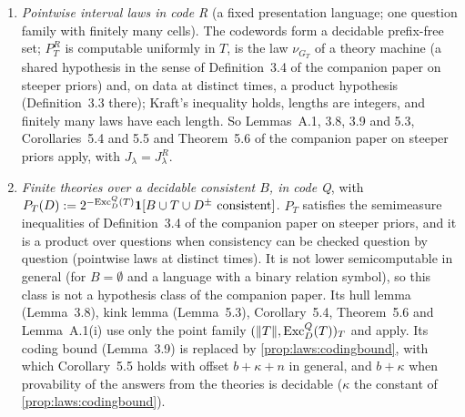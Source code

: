 \begin{proposition}\label{prop:laws:P2hyp}
\leavevmode
\begin{enumerate}[label=(\alph*),itemsep=1pt,topsep=2pt]
\item \emph{Pointwise interval laws in code R} (a fixed presentation language; one question family with finitely many cells). The codewords form a decidable prefix-free set; $P^R_T$ is computable uniformly in $T$, is the law $\nu_{G_T}$ of a theory machine (a shared hypothesis in the sense of Definition~3.4 of the companion paper on steeper priors) and, on data at distinct times, a product hypothesis (Definition~3.3 there); Kraft's inequality holds, lengths are integers, and finitely many laws have each length. So Lemmas~A.1, 3.8, 3.9 and 5.3, Corollaries~5.4 and 5.5 and Theorem~5.6 of the companion paper on steeper priors apply, with $J_\lambda=J^R_\lambda$.
\item \emph{Finite theories over a decidable consistent $B$, in code Q}, with $P_T(D):=2^{-\mathrm{Exc}^Q_D(T)}\mathbf{1}[B\cup T\cup D^\pm\text{ consistent}]$. $P_T$ satisfies the semimeasure inequalities of Definition~3.4 of the companion paper on steeper priors, and it is a product over questions when consistency can be checked question by question (pointwise laws at distinct times). It is not lower semicomputable in general (for $B=\emptyset$ and a language with a binary relation symbol), so this class is not a hypothesis class of the companion paper. Its hull lemma (Lemma~3.8), kink lemma (Lemma~5.3), Corollary~5.4, Theorem~5.6 and Lemma~A.1(i) use only the point family $(\lVert T\rVert,\mathrm{Exc}^Q_D(T))_T$ and apply. Its coding bound (Lemma~3.9) is replaced by \cref{prop:laws:codingbound}, with which Corollary~5.5 holds with offset $b+\kappa+n$ in general, and $b+\kappa$ when provability of the answers from the theories is decidable ($\kappa$ the constant of \cref{prop:laws:codingbound}).
\end{enumerate}
\end{proposition}

